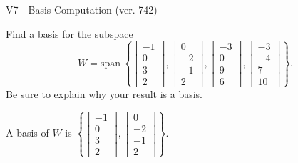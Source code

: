 \begin{exercise}
  \begin{exerciseTitle}V7 - Basis Computation (ver. 742)\end{exerciseTitle}
  \begin{exerciseStatement}
    Find a basis for the subspace 
\[W=\mathrm{span}\ \left\{\left[\begin{array}{r}
-1 \\
0 \\
3 \\
2
\end{array}\right] , \left[\begin{array}{r}
0 \\
-2 \\
-1 \\
2
\end{array}\right] , \left[\begin{array}{r}
-3 \\
0 \\
9 \\
6
\end{array}\right] , \left[\begin{array}{r}
-3 \\
-4 \\
7 \\
10
\end{array}\right]\right\}.\]
 Be sure to explain why your result is a basis.


  \end{exerciseStatement}
  \begin{exerciseAnswer}
   A basis of \(W\) is  \(\left\{\left[\begin{array}{r}
-1 \\
0 \\
3 \\
2
\end{array}\right] , \left[\begin{array}{r}
0 \\
-2 \\
-1 \\
2
\end{array}\right]\right\}\).
  


  \end{exerciseAnswer}
\end{exercise}